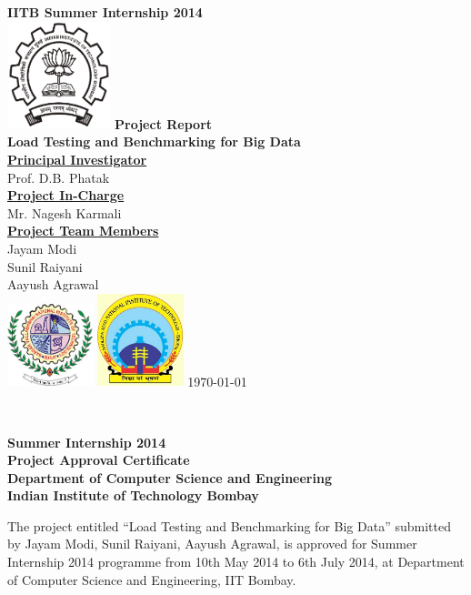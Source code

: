 \documentclass[12pt]{book}
\begin{document}
\begin{titlepage}
 \begin{center}
\Huge
\textbf{IITB Summer Internship 2014} \\
\vfill
\includegraphics[width=3cm]{IITB_logo.png}
\vfill
\Huge
\textbf{Project Report}\\
\vfill
\textbf{Load Testing and Benchmarking for Big Data}\\
\vfill
\LARGE
\underline{\textbf{Principal Investigator}} \\
Prof. D.B. Phatak\\
\vfill
\LARGE
\underline{\textbf{Project In-Charge}} \\
Mr. Nagesh Karmali\\
\vfill
\Large
\underline{\textbf{Project Team Members}}\\
Jayam Modi\\
Sunil Raiyani\\
Aayush Agrawal\\
\vfill
\includegraphics[width=2.5cm]{svnit.jpg} \hfill
\includegraphics[width=2.5cm]{manit.jpg} \hfill
\vfill
\today
\end{center}
\end{titlepage}

\pagebreak \textcolor{white}{text} \pagebreak
\thispagestyle{empty}

\begin{center}
\thispagestyle{empty}
\LARGE
\textbf{Summer Internship 2014 \\ Project Approval Certificate} \\
\vskip12pt
\Large
\textbf{Department of Computer Science and Engineering} \\
\vskip5pt
\textbf{Indian Institute of Technology Bombay} \\
\end{center}
\vfill
\normalsize
The project entitled ``Load Testing and Benchmarking for Big Data'' submitted by Jayam Modi, Sunil Raiyani, Aayush Agrawal,  is approved 
for Summer Internship 2014 programme from 10th May 2014 to 6th July 2014, at Department of Computer Science and Engineering, IIT Bombay.
\end{document}
